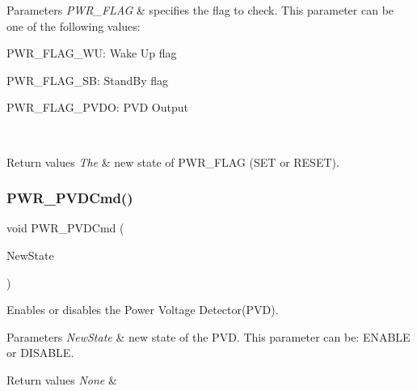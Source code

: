 \begin{DoxyParams}{Parameters}
{\em P\+W\+R\+\_\+\+F\+L\+AG} & specifies the flag to check. This parameter can be one of the following values\+: \begin{DoxyItemize}
\item P\+W\+R\+\_\+\+F\+L\+A\+G\+\_\+\+WU\+: Wake Up flag \item P\+W\+R\+\_\+\+F\+L\+A\+G\+\_\+\+SB\+: Stand\+By flag \item P\+W\+R\+\_\+\+F\+L\+A\+G\+\_\+\+P\+V\+DO\+: P\+VD Output \end{DoxyItemize}
\\
\hline
\end{DoxyParams}

\begin{DoxyRetVals}{Return values}
{\em The} & new state of P\+W\+R\+\_\+\+F\+L\+AG (S\+ET or R\+E\+S\+ET). \\
\hline
\end{DoxyRetVals}
\mbox{\label{group___p_w_r___private___functions_ga42cad476b816e0a33594a933b3ed1acd}} 
\subsubsection{\texorpdfstring{PWR\_PVDCmd()}{PWR\_PVDCmd()}}
{\footnotesize\ttfamily void P\+W\+R\+\_\+\+P\+V\+D\+Cmd (\begin{DoxyParamCaption}\item[{\mbox{\hyperlink{group___exported__types_gac9a7e9a35d2513ec15c3b537aaa4fba1}{Functional\+State}}}]{New\+State }\end{DoxyParamCaption})}



Enables or disables the Power Voltage Detector(\+P\+V\+D). 


\begin{DoxyParams}{Parameters}
{\em New\+State} & new state of the P\+VD. This parameter can be\+: E\+N\+A\+B\+LE or D\+I\+S\+A\+B\+LE. \\
\hline
\end{DoxyParams}

\begin{DoxyRetVals}{Return values}
{\em None} & \\
\hline
\end{DoxyRetVals}
\mbox{\label{group___p_w_r___private___functions_ga237c143ef6aa55abb8049fa7bf24ab8f}} 
